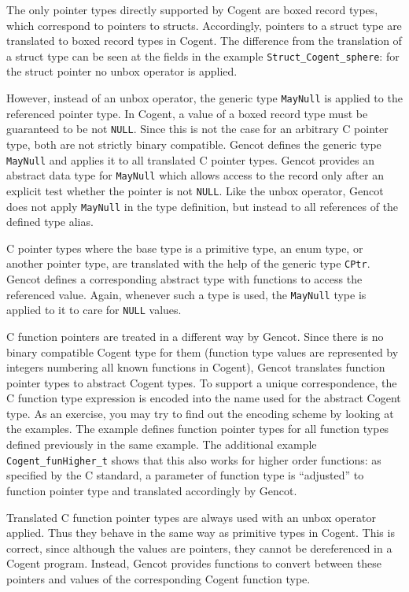 \documentclass[a4paper]{report}
\newcommand{\code}[1]{\textnormal{\texttt{#1}}}
\begin{document}
The only pointer types directly supported by Cogent are boxed record types, which correspond to pointers to structs.
Accordingly, pointers to a struct type are translated to boxed record types in Cogent. The difference from the translation
of a struct type can be seen at the fields in the example \code{Struct\_Cogent\_sphere}: for the struct pointer no
unbox operator is applied. 

However, instead of an unbox operator, the generic type \code{MayNull} is applied to the referenced pointer type. In 
Cogent, a value of a boxed record type must be guaranteed to be not \code{NULL}. Since this is not the case for an 
arbitrary C pointer type, both are not strictly binary compatible. Gencot defines the generic type \code{MayNull}
and applies it to all translated C pointer types. Gencot provides an abstract data type for \code{MayNull} which allows
access to the record only after an explicit test whether the pointer is not \code{NULL}. Like the unbox operator,
Gencot does not apply \code{MayNull} in the type definition, but instead to all references of the defined type alias.

C pointer types where the base type is a primitive type, an enum type, or another pointer type, are translated with the
help of the generic type \code{CPtr}. Gencot defines a corresponding abstract type with functions to access the 
referenced value. Again, whenever such a type is used, the \code{MayNull} type is applied to it to care for \code{NULL} 
values.

C function pointers are treated in a different way by Gencot. Since there is no binary compatible Cogent type for them 
(function type values are represented by integers numbering all known functions in Cogent), Gencot translates function pointer
types to abstract Cogent types. To support a unique correspondence, the C function type expression is encoded into
the name used for the abstract Cogent type. As an exercise, you may try to find out the encoding scheme by looking
at the examples. The example defines function pointer types for all function types defined previously in the same example. 
The additional example \code{Cogent\_funHigher\_t} shows that this also works for higher order functions: as specified by the 
C standard, a parameter of function type is ``adjusted'' to function pointer type and translated accordingly by Gencot.

Translated C function pointer types are always used with an unbox operator applied. Thus they behave in the same way as 
primitive types in Cogent. This is correct, since although the values are pointers, they cannot be dereferenced in 
a Cogent program. Instead, Gencot provides functions to convert between these pointers and values of the corresponding
Cogent function type.
\end{document}
